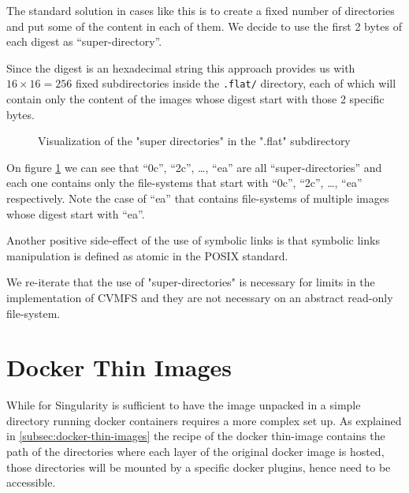 The standard solution in cases like this is to create a fixed number of directories and put some of the content in each of them.
We decide to use the first 2 bytes of each digest as “super-directory”.

Since the digest is an hexadecimal string this approach provides us with $16 \times 16 = 256$ fixed subdirectories inside the \texttt{.flat/} directory, each of which will contain only the content of the images whose digest start with those 2 specific bytes.

\begin{figure}
\caption{Visualization of the "super directories" in the ".flat" subdirectory}
\label{fig:super-directories}
\end{figure}

On figure \ref{fig:super-directories} we can see that “0c”, “2c”, …, “ea” are all “super-directories” and each one contains only the file-systems that start with “0c”, “2c”, …, “ea” respectively.
Note the case of “ea” that contains file-systems of multiple images whose digest start with “ea”.

Another positive side-effect of the use of symbolic links is that symbolic links manipulation is defined as atomic in the POSIX standard.

We re-iterate that the use of "super-directories" is necessary for limits in the implementation of CVMFS and they are not necessary on an abstract read-only file-system.

\section{Docker Thin Images}

While for Singularity is sufficient to have the image unpacked in a simple directory running docker containers requires a more complex set up.
As explained in \ref{subsec:docker-thin-images} the recipe of the docker thin-image contains the path of the directories where each layer of the original docker image is hosted, those directories will be mounted by a specific docker plugins, hence need to be accessible.

